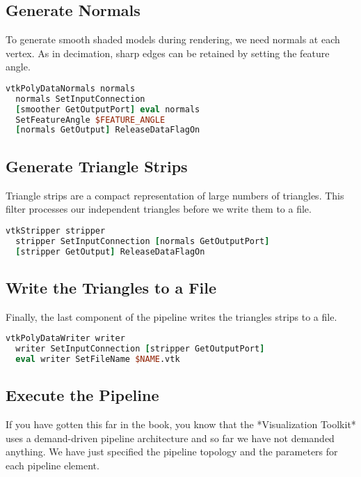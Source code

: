 \subsection{Generate Normals}
To generate smooth shaded models during rendering, we need normals at each vertex. As in decimation, sharp edges can be retained by setting the feature angle.

\begin{lstlisting}[language=TCL, caption={Generate Normals.}]
vtkPolyDataNormals normals
  normals SetInputConnection
  [smoother GetOutputPort] eval normals
  SetFeatureAngle $FEATURE_ANGLE
  [normals GetOutput] ReleaseDataFlagOn
\end{lstlisting}

\subsection{Generate Triangle Strips}

Triangle strips are a compact representation of large numbers of triangles. This filter processes our independent triangles before we write them to a file.

\begin{lstlisting}[language=TCL, caption={Generate Triangle Strips.}]
vtkStripper stripper
  stripper SetInputConnection [normals GetOutputPort]
  [stripper GetOutput] ReleaseDataFlagOn
\end{lstlisting}

\subsection{Write the Triangles to a File}

Finally, the last component of the pipeline writes the triangles strips to a file.

\begin{lstlisting}[language=TCL, caption={Write the Triangles to a File.}]
vtkPolyDataWriter writer
  writer SetInputConnection [stripper GetOutputPort]
  eval writer SetFileName $NAME.vtk
\end{lstlisting}

\subsection{Execute the Pipeline}

If you have gotten this far in the book, you know that the *Visualization Toolkit* uses a demand-driven pipeline architecture and so far we have not demanded anything. We have just specified the pipeline topology and the parameters for each pipeline element.

